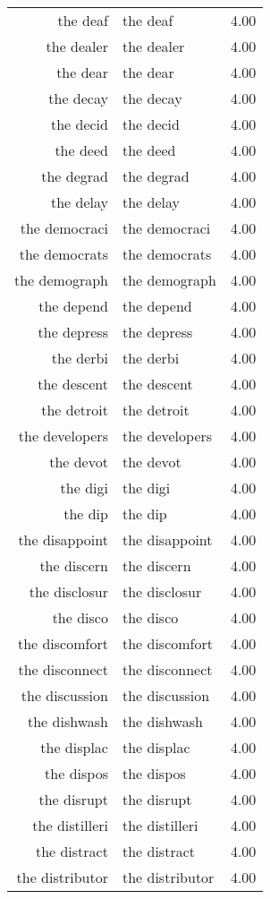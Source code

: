 \begin{table}[ht]
\begin{tabular}{rlr}
  the deaf & the deaf & 4.00 \\ 
  the dealer & the dealer & 4.00 \\ 
  the dear & the dear & 4.00 \\ 
  the decay & the decay & 4.00 \\ 
  the decid & the decid & 4.00 \\ 
  the deed & the deed & 4.00 \\ 
  the degrad & the degrad & 4.00 \\ 
  the delay & the delay & 4.00 \\ 
  the democraci & the democraci & 4.00 \\ 
  the democrats & the democrats & 4.00 \\ 
  the demograph & the demograph & 4.00 \\ 
  the depend & the depend & 4.00 \\ 
  the depress & the depress & 4.00 \\ 
  the derbi & the derbi & 4.00 \\ 
  the descent & the descent & 4.00 \\ 
  the detroit & the detroit & 4.00 \\ 
  the developers & the developers & 4.00 \\ 
  the devot & the devot & 4.00 \\ 
  the digi & the digi & 4.00 \\ 
  the dip & the dip & 4.00 \\ 
  the disappoint & the disappoint & 4.00 \\ 
  the discern & the discern & 4.00 \\ 
  the disclosur & the disclosur & 4.00 \\ 
  the disco & the disco & 4.00 \\ 
  the discomfort & the discomfort & 4.00 \\ 
  the disconnect & the disconnect & 4.00 \\ 
  the discussion & the discussion & 4.00 \\ 
  the dishwash & the dishwash & 4.00 \\ 
  the displac & the displac & 4.00 \\ 
  the dispos & the dispos & 4.00 \\ 
  the disrupt & the disrupt & 4.00 \\ 
  the distilleri & the distilleri & 4.00 \\ 
  the distract & the distract & 4.00 \\ 
  the distributor & the distributor & 4.00 \\ 

\end{tabular}
\end{table}

